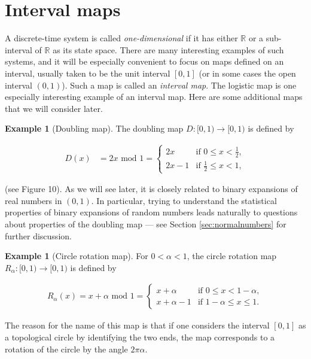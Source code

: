 \documentclass[11pt]{report}
\theoremstyle{plain}
\theoremstyle{definition}
\newtheorem{example}[thm]{Example}
\begin{document}
\section{Interval maps}
A discrete-time system is called \emph{one-dimensional} if
it has either $\mathbb{R}$ or a sub-interval of
$\mathbb{R}$ as its state space. There are many
interesting examples of such systems, and it will be
especially convenient to focus on maps defined on an
interval, usually taken to be the unit interval
$[0,1]$ (or in some cases the open interval $(0,1)$).
Such a map is called an \emph{interval map}. The logistic
map is one especially interesting example of an
interval map. Here are some additional maps that we
will consider later.

\begin{example}[Doubling map]
The doubling map $D:[0,1)\to[0,1)$ is defined by

\begin{align*}
D(x) &= 2x \textrm{ mod } 1 = \begin{cases}
2x & \textrm{if }0\le x<\tfrac12, \\ 2x-1 & \textrm{if }\tfrac12 \le x < 1,
\end{cases}
\end{align*}

(see Figure 10). As we will see later, it is closely
related to binary expansions of real numbers in
$(0,1)$. In particular, trying to understand the
statistical properties of binary expansions of random
numbers leads naturally to questions about properties
of the doubling map --- see Section
\ref{sec:normalnumbers} for further discussion.
\end{example}

\begin{example}[Circle rotation map]
For $0<\alpha<1$, the circle rotation map
$R_\alpha:[0,1)\to[0,1)$ is defined by

\begin{align*}
R_\alpha(x) = x+\alpha\textrm{ mod }1
= \begin{cases}
x+\alpha & \textrm{if }0\le x<1-\alpha, \\
x+\alpha-1 & \textrm{if } 1-\alpha \le x\le 1.
\end{cases}
\end{align*}

The reason for the name of this map is that if one
considers the interval $[0,1]$ as a topological
circle by identifying the two ends, the map
corresponds to a rotation of the circle by the angle
$2\pi \alpha$.
\end{example}
\end{document}
